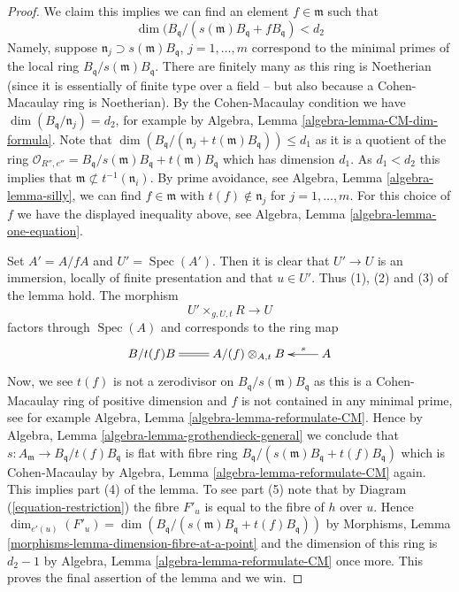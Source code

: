 \documentclass{stacks-project}
\theoremstyle{plain}
\theoremstyle{definition}
\theoremstyle{remark}
\numberwithin{equation}{subsection}
\def\Spec{\mathop{\mathrm{Spec}}}
\begin{document}
\begin{proof}
\medskip\noindent
We claim this implies we can find
an element $f \in \mathfrak m$ such that
$$
\dim(B_{\mathfrak q}/(s(\mathfrak m)B_{\mathfrak q} + fB_{\mathfrak q}) < d_2
$$
Namely, suppose $\mathfrak n_j \supset s(\mathfrak m)B_{\mathfrak q}$,
$j = 1, \ldots, m$ correspond to the minimal primes of the local ring
$B_{\mathfrak q}/s(\mathfrak m)B_{\mathfrak q}$.
There are finitely many as this ring is Noetherian (since it is essentially
of finite type over a field -- but also because a Cohen-Macaulay ring is
Noetherian). By the Cohen-Macaulay condition we have
$\dim(B_{\mathfrak q}/\mathfrak n_j) = d_2$, for example by
Algebra, Lemma \ref{algebra-lemma-CM-dim-formula}.
Note that
$\dim(B_{\mathfrak q}/(\mathfrak n_j + t(\mathfrak m)B_{\mathfrak q}))
\leq d_1$
as it is a quotient of the ring
$\mathcal{O}_{R'', e''} =
B_{\mathfrak q}/s(\mathfrak m)B_{\mathfrak q} + t(\mathfrak m)B_{\mathfrak q}$
which has dimension $d_1$. As $d_1 < d_2$ this implies that
$\mathfrak m \not \subset t^{-1}(\mathfrak n_i)$.
By prime avoidance, see
Algebra, Lemma \ref{algebra-lemma-silly},
we can find $f \in \mathfrak m$ with $t(f) \not \in \mathfrak n_j$ for
$j = 1, \ldots, m$. For this choice of $f$ we have
the displayed inequality above, see
Algebra, Lemma \ref{algebra-lemma-one-equation}.

\medskip\noindent
Set $A' = A/fA$ and $U' = \Spec(A')$. Then it is clear that
$U' \to U$ is an immersion, locally of finite presentation
and that $u \in U'$. Thus (1), (2) and (3) of the lemma hold.
The morphism
$$
U' \times_{g, U, t} R \longrightarrow U
$$
factors through $\Spec(A)$ and corresponds to the ring map
$$
\xymatrix{
B/t(f)B \ar@{=}[r] & A/(f) \otimes_{A, t} B & A \ar[l]_-s
}
$$
Now, we see $t(f)$ is not a zerodivisor on
$B_{\mathfrak q}/s(\mathfrak m)B_{\mathfrak q}$ as this is a
Cohen-Macaulay ring of positive dimension and $f$ is not contained
in any minimal prime, see for example
Algebra, Lemma \ref{algebra-lemma-reformulate-CM}.
Hence by
Algebra, Lemma \ref{algebra-lemma-grothendieck-general}
we conclude that $s : A_{\mathfrak m} \to B_{\mathfrak q}/t(f)B_{\mathfrak q}$
is flat with fibre ring
$B_{\mathfrak q}/(s(\mathfrak m)B_{\mathfrak q} + t(f)B_{\mathfrak q})$
which is Cohen-Macaulay by
Algebra, Lemma \ref{algebra-lemma-reformulate-CM}
again. This implies part (4) of the lemma.
To see part (5) note that by Diagram (\ref{equation-restriction})
the fibre $F'_u$ is equal to the fibre of $h$ over $u$.
Hence
$\dim_{e'(u)}(F'_u) =
\dim(B_{\mathfrak q}/(s(\mathfrak m)B_{\mathfrak q} + t(f)B_{\mathfrak q}))$
by
Morphisms, Lemma \ref{morphisms-lemma-dimension-fibre-at-a-point}
and the dimension of this ring is $d_2 - 1$ by
Algebra, Lemma \ref{algebra-lemma-reformulate-CM}
once more. This proves the final assertion of the lemma and we win.
\end{proof}
\end{document}

